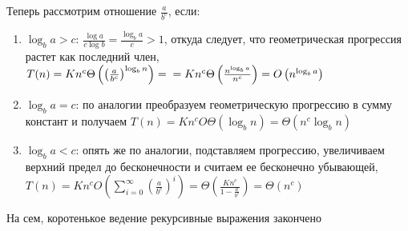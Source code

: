 Теперь рассмотрим отношение $\frac{a}{b^c}$, если:
\begin{enumerate}
\item $\log_b a > c$: $\frac{\log a}{c\log b} = \frac{\log_b a}{c} > 1$, откуда следует, что геометрическая прогрессия растет как последний член, $T(n) = K n^c \Theta \left(\left( \frac{a}{b^c} \right)^{\log_b n}\right) = \\ = K n^c \Theta \left(\frac{n^{\log_b a}}{n^c}\right) = O \left( n^{\log_b a} \right)$

\item $\log_b a = c$: по аналогии преобразуем геометрическую прогрессию в сумму констант и получаем $T(n) = K n^c O\Theta \left(\log_b n\right) = \Theta \left( n^c \log_b n \right)$

\item $\log_b a < c$: опять же по аналогии, подставляем прогрессию, увеличиваем верхний предел до бесконечности и считаем ее бесконечно убывающей, $T(n) = K n^c O \left(\sum_{i=0}^{\infty} \left(\frac{a}{b^c}\right)^i\right) = \Theta \left(\frac{K n^c}{1 - \frac{a}{b^c}}\right) = \Theta \left(n^c\right)$
\end{enumerate}

На сем, коротенькое ведение  рекурсивные выражения закончено
